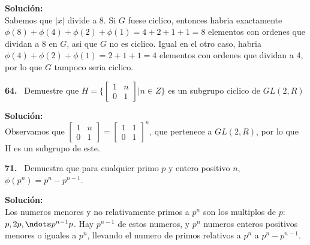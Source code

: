 \documentclass{article}
\newcounter{problem}
\newcounter{solution}
\newcommand\Problem[1]{%
  \stepcounter{problem}%
  \textbf{#1.}~%
  \setcounter{solution}{0}%
}
\newcommand\TheSolution{%
  \textbf{Solución:}\\%
}
\begin{document}
\TheSolution{} Sabemos que $|x|$ divide a $8$. Si $G$ fuese ciclico, entonces
habria exactamente $\phi(8) + \phi(4) + \phi(2) + \phi(1) = 4 + 2 + 1 + 1 = 8$
elementos con ordenes que dividan a $8$ en $G$, asi que $G$ no es ciclico.
Igual en el otro caso, habria $\phi(4) + \phi(2) + \phi(1) = 2 + 1 + 1 = 4$
elementos con ordenes que dividan a 4, por lo que $G$ tampoco seria ciclico.

\Problem{64} Demuestre que $H = \Bigg\{\begin{bmatrix}
  1 & n \\
  0 & 1
\end{bmatrix} | n \in Z\Bigg\}$ es un subgrupo ciclico de $GL(2, R)$

\TheSolution{} Observamos que $\begin{bmatrix}
  1 & n \\
  0 & 1
\end{bmatrix} = \begin{bmatrix}
  1 & 1 \\
  0 & 1
\end{bmatrix}^{n}$, que pertenece a $GL(2, R)$, por lo que H es un subgrupo de
este.

\Problem{71} Demuestra que para cualquier primo $p$ y entero positivo $n$,
$\phi(p^n) = p^n - p^{n - 1}$.

\TheSolution{} Los numeros menores y no relativamente primos a $p^n$ son los
multiplos de $p$: $p, 2p, \ndots p^{n-1}p$. Hay $p^{n-1}$ de estos numeros, y
$p^n$ numeros enteros positivos menores o iguales a $p^n$, llevando el numero
de primos relativos a $p^n$ a $p^n - p^{n-1}$.
\end{document}
